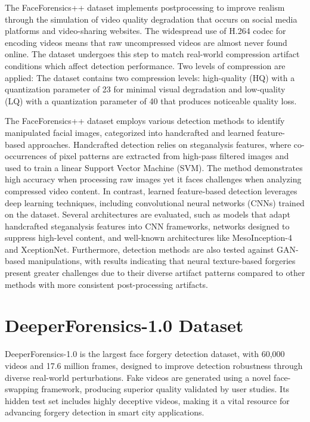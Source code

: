 \documentclass{article} %
\begin{document}
The FaceForensics++ dataset implements postprocessing to improve realism through the simulation of video quality degradation that occurs on social media platforms and video-sharing websites. The widespread use of H.264 codec for encoding videos means that raw uncompressed videos are almost never found online. The dataset undergoes this step to match real-world compression artifact conditions which affect detection performance. Two levels of compression are applied: The dataset contains two compression levels: high-quality (HQ) with a quantization parameter of 23 for minimal visual degradation and low-quality (LQ) with a quantization parameter of 40 that produces noticeable quality loss.

The FaceForensics++ dataset employs various detection methods to identify manipulated facial images, categorized into handcrafted and learned feature-based approaches. Handcrafted detection relies on steganalysis features, where co-occurrences of pixel patterns are extracted from high-pass filtered images and used to train a linear Support Vector Machine (SVM)\cite{Fridrich2012}. The method demonstrates high accuracy when processing raw images yet it faces challenges when analyzing compressed video content. In contrast, learned feature-based detection leverages deep learning techniques, including convolutional neural networks (CNNs) trained on the dataset. Several architectures are evaluated, such as models that adapt handcrafted steganalysis features into CNN frameworks, networks designed to suppress high-level content, and well-known architectures like MesoInception-4\cite{Afchar2018} and XceptionNet\cite{Chollet2017}. Furthermore, detection methods are also tested against GAN-based manipulations, with results indicating that neural texture-based forgeries present greater challenges due to their diverse artifact patterns compared to other methods with more consistent post-processing artifacts.

\section{DeeperForensics-1.0 Dataset}

DeeperForensics-1.0 is the largest face forgery detection dataset, with 60,000 videos and 17.6 million frames, designed to improve detection robustness through diverse real-world perturbations. Fake videos are generated using a novel face-swapping framework, producing superior quality validated by user studies. Its hidden test set includes highly deceptive videos, making it a vital resource for advancing forgery detection in smart city applications\cite{jiang2020deeperforensics}. 
\end{document}

